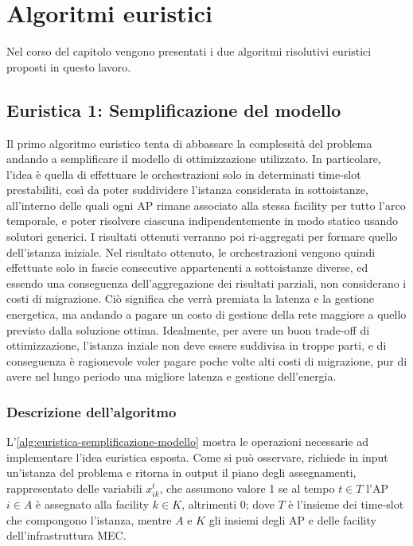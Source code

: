 \chapter{Algoritmi euristici}
\label{cap:algoritmi-euristici}

Nel corso del capitolo vengono presentati i due algoritmi risolutivi euristici proposti in questo lavoro.


%
%
\section{Euristica 1: Semplificazione del modello}
\label{sec:semplificazione-modello}

Il primo algoritmo euristico tenta di abbassare la complessità del problema andando a semplificare il modello di ottimizzazione utilizzato. In particolare, l'idea è quella di effettuare le orchestrazioni solo in determinati time-slot prestabiliti, così da poter suddividere l'istanza considerata in sottoistanze, all'interno delle quali ogni AP rimane associato alla stessa facility per tutto l'arco temporale, e poter risolvere ciascuna indipendentemente in modo statico usando solutori generici. I risultati ottenuti verranno poi ri-aggregati per formare quello dell'istanza iniziale. Nel risultato ottenuto, le orchestrazioni vengono quindi effettuate solo in fascie consecutive appartenenti a sottoistanze diverse, ed essendo una conseguenza dell'aggregazione dei risultati parziali, non considerano i costi di migrazione. Ciò significa che verrà premiata la latenza e la gestione energetica, ma andando a pagare un costo di gestione della rete maggiore a quello previsto dalla soluzione ottima. Idealmente, per avere un buon trade-off di ottimizzazione, l'istanza inziale non deve essere suddivisa in troppe parti, e di conseguenza è ragionevole voler pagare poche volte alti costi di migrazione, pur di avere nel lungo periodo una migliore latenza e gestione dell'energia.


\subsection{Descrizione dell'algoritmo}
\label{subsec:algoritmo-sempl-modello}



L'\autoref{alg:euristica-semplificazione-modello} mostra le operazioni necessarie ad implementare l'idea euristica esposta. Come si può osservare, richiede in input un'istanza del problema e ritorna in output il piano degli assegnamenti, rappresentato delle variabili $x^t_{ik}$, che assumono valore 1 se al tempo $t \in T$ l'AP $i \in A$ è assegnato alla facility $k \in K$, altrimenti 0; dove $T$ è l'insieme dei time-slot che compongono l'istanza, mentre $A$ e $K$ gli insiemi degli AP e delle facility dell'infrastruttura MEC.

